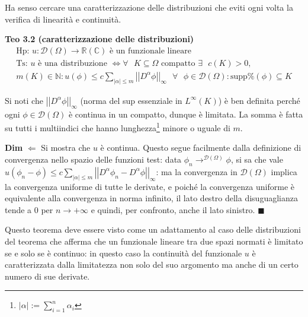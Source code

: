 \documentclass{article}
\begin{document}
Ha senso cercare una caratterizzazione delle distribuzioni che eviti ogni
volta la verifica di linearit\`{a} e continuit\`{a}.

\textbf{Teo 3.2 (caratterizzazione delle distribuzioni)}%
\begin{gather*}
\text{Hp: }u:\mathcal{D}\left( \Omega \right) \rightarrow 
\mathbb{R}
\left( 
\mathbb{C}
\right) \text{ \`{e} un funzionale lineare} \\
\text{Ts: }u\text{ \`{e} una distribuzione }\Longleftrightarrow \forall 
\text{ }K\subseteq \Omega \text{ compatto }\exists \text{ }c\left( K\right)
>0, \\
m\left( K\right) \in 
\mathbb{N}
:u\left( \phi \right) \leq c\sum_{\left\vert \alpha \right\vert \leq
m}\left\vert \left\vert D^{\alpha }\phi \right\vert \right\vert _{\infty }%
\text{ }\forall \text{ }\phi \in \mathcal{D}\left( \Omega \right) :\text{supp%
}\left( \phi \right) \subseteq K
\end{gather*}

Si noti che $\left\vert \left\vert D^{\alpha }\phi \right\vert \right\vert
_{\infty }$ (norma del sup essenziale in $L^{\infty }\left( K\right) $) \`{e}
ben definita perch\'{e} ogni $\phi \in \mathcal{D}\left( \Omega \right) $ 
\`{e} continua in un compatto, dunque \`{e} limitata. La somma \`{e} fatta
su tutti i multiindici che hanno lunghezza\footnote{$\left\vert \alpha
\right\vert :=\sum_{i=1}^{n}\alpha _{i}$} minore o uguale di $m$.

\textbf{Dim} $\Longleftarrow $ Si mostra che $u$ \`{e} continua. Questo
segue facilmente dalla definizione di convergenza nello spazio delle
funzioni test: data $\phi _{n}\rightarrow ^{\mathcal{D}\left( \Omega \right)
}\phi $, si sa che vale $u\left( \phi _{n}-\phi \right) \leq
c\sum_{\left\vert \alpha \right\vert \leq m}\left\vert \left\vert D^{\alpha
}\phi _{n}-D^{\alpha }\phi \right\vert \right\vert _{\infty }$: ma la
convergenza in $\mathcal{D}\left( \Omega \right) $ implica la convergenza
uniforme di tutte le derivate, e poich\'{e} la convergenza uniforme \`{e}
equivalente alla convergenza in norma infinito, il lato destro della
disuguaglianza tende a $0$ per $n\rightarrow +\infty $ e quindi, per
confronto, anche il lato sinistro. $\blacksquare $

Questo teorema deve essere visto come un adattamento al caso delle
distribuzioni del teorema che afferma che un funzionale lineare tra due
spazi normati \`{e} limitato se e solo se \`{e} continuo: in questo caso la
continuit\`{a} del funzionale $u$ \`{e} caratterizzata dalla limitatezza non
solo del suo argomento ma anche di un certo numero di sue derivate.
\end{document}
